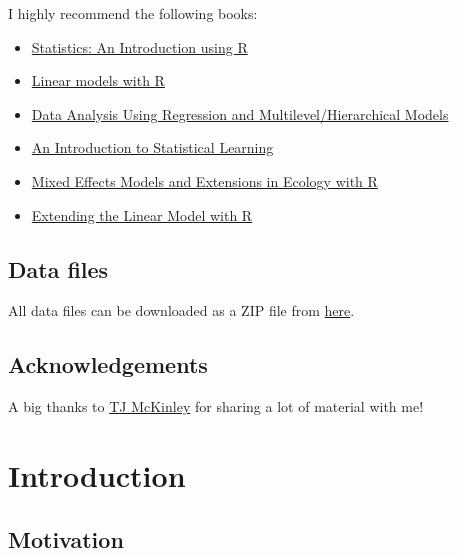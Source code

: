 \documentclass[]{book}
\providecommand{\tightlist}{%
  \setlength{\itemsep}{0pt}\setlength{\parskip}{0pt}}
\theoremstyle{definition}
\theoremstyle{definition}
\theoremstyle{definition}
\theoremstyle{remark}
\begin{document}
I highly recommend the following books:

\begin{itemize}
\tightlist
\item
  \href{https://www.wiley.com/en-gb/Statistics\%3A+An+Introduction+using+R-p-9780470022986}{Statistics:
  An Introduction using R}
\item
  \href{https://www.crcpress.com/Linear-Models-with-R/Faraway/p/book/9781439887332}{Linear
  models with R}
\item
  \href{http://www.stat.columbia.edu/~gelman/arm/}{Data Analysis Using
  Regression and Multilevel/Hierarchical Models}
\item
  \href{http://www-bcf.usc.edu/~gareth/ISL/}{An Introduction to
  Statistical Learning}
\item
  \href{https://www.springer.com/gb/book/9780387874579}{Mixed Effects
  Models and Extensions in Ecology with R}
\item
  \href{https://www.amazon.co.uk/Extending-Linear-Model-Generalized-Nonparametric/dp/158488424X}{Extending
  the Linear Model with R}
\end{itemize}

\section*{Data files}\label{data-files}

All data files can be downloaded as a ZIP file from
\href{https://exeter-data-analytics.github.io/StatModelling/dataFiles.zip}{here}.

\section*{Acknowledgements}\label{acknowledgements}

A big thanks to
\href{http://emps.exeter.ac.uk/mathematics/staff/tm389}{TJ McKinley} for
sharing a lot of material with me!

\chapter{Introduction}\label{introduction}

\section{Motivation}\label{motivation}
\end{document}
